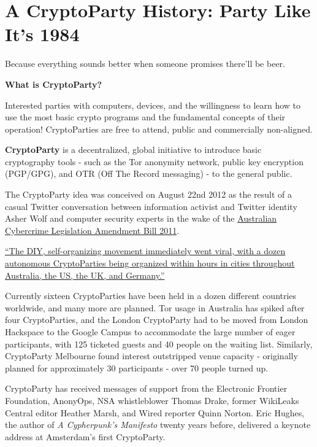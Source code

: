 \section{A CryptoParty History: Party Like It's 1984}

Because everything sounds better when someone promises there'll be beer.

\textbf{What is CryptoParty?}

Interested parties with computers, devices, and the willingness to learn
how to use the most basic crypto programs and the fundamental concepts
of their operation! CryptoParties are free to attend, public and
commercially non-aligned.

\textbf{CryptoParty} is a decentralized, global initiative to introduce
basic cryptography tools - such as the Tor anonymity network, public key
encryption (PGP/GPG), and OTR (Off The Record messaging) - to the
general public.

The CryptoParty idea was conceived on August 22nd 2012 as the result of
a casual Twitter conversation between information activist and Twitter
identity Asher Wolf and computer security experts in the wake of the
\href{http://theconversation.edu.au/cybercrime-bill-makes-it-through-but-what-does-that-mean-for-you-8953}{Australian
Cybercrime Legislation Amendment Bill 2011}.

\href{http://en.wikipedia.org/wiki/CryptoParty}{``The DIY,
self-organizing movement immediately went viral, with a dozen autonomous
CryptoParties being organized within hours in cities throughout
Australia, the US, the UK, and Germany.''}

Currently sixteen CryptoParties have been held in a dozen different
countries worldwide, and many more are planned. Tor usage in Australia
has spiked after four CryptoParties, and the London CryptoParty had to
be moved from London Hackspace to the Google Campus to accommodate the
large number of eager participants, with 125 ticketed guests and 40
people on the waiting list. Similarly, CryptoParty Melbourne found
interest outstripped venue capacity - originally planned for
approximately 30 participants - over 70 people turned up.

CryptoParty has received messages of support from the Electronic
Frontier Foundation, AnonyOps, NSA whistleblower Thomas Drake, former
WikiLeaks Central editor Heather Marsh, and Wired reporter Quinn Norton.
Eric Hughes, the author of \emph{A Cypherpunk's Manifesto} twenty years
before, delivered a keynote address at Amsterdam's first CryptoParty.
